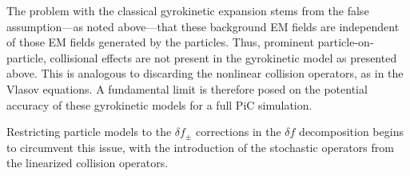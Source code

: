     The problem with the classical gyrokinetic expansion stems from the false assumption---as noted above---that these background EM fields are independent of those EM fields generated by the particles. Thus, prominent particle-on-particle, collisional effects are not present in the gyrokinetic model as presented above. This is analogous to discarding the nonlinear collision operators, as in the Vlasov equations. A fundamental limit is therefore posed on the potential accuracy of these gyrokinetic models for a full PiC simulation.

    Restricting particle models to the $\delta\!f_{\pm}$ corrections in the $\delta\!f$ decomposition begins to circumvent this issue, with the introduction of the stochastic operators from the linearized collision operators.
        

